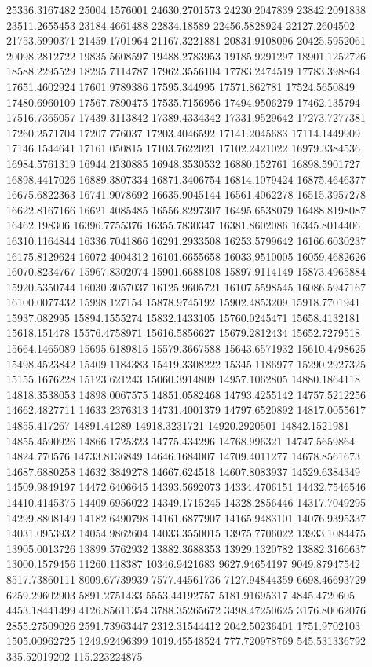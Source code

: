 \documentclass[draft=on]{scrbook}
\begin{document}
25336.3167482
25004.1576001
24630.2701573
24230.2047839
23842.2091838
23511.2655453
23184.4661488
22834.18589
22456.5828924
22127.2604502
21753.5990371
21459.1701964
21167.3221881
20831.9108096
20425.5952061
20098.2812722
19835.5608597
19488.2783953
19185.9291297
18901.1252726
18588.2295529
18295.7114787
17962.3556104
17783.2474519
17783.398864
17651.4602924
17601.9789386
17595.344995
17571.862781
17524.5650849
17480.6960109
17567.7890475
17535.7156956
17494.9506279
17462.135794
17516.7365057
17439.3113842
17389.4334342
17331.9529642
17273.7277381
17260.2571704
17207.776037
17203.4046592
17141.2045683
17114.1449909
17146.1544641
17161.050815
17103.7622021
17102.2421022
16979.3384536
16984.5761319
16944.2130885
16948.3530532
16880.152761
16898.5901727
16898.4417026
16889.3807334
16871.3406754
16814.1079424
16875.4646377
16675.6822363
16741.9078692
16635.9045144
16561.4062278
16515.3957278
16622.8167166
16621.4085485
16556.8297307
16495.6538079
16488.8198087
16462.198306
16396.7755376
16355.7830347
16381.8602086
16345.8014406
16310.1164844
16336.7041866
16291.2933508
16253.5799642
16166.6030237
16175.8129624
16072.4004312
16101.6655658
16033.9510005
16059.4682626
16070.8234767
15967.8302074
15901.6688108
15897.9114149
15873.4965884
15920.5350744
16030.3057037
16125.9605721
16107.5598545
16086.5947167
16100.0077432
15998.127154
15878.9745192
15902.4853209
15918.7701941
15937.082995
15894.1555274
15832.1433105
15760.0245471
15658.4132181
15618.151478
15576.4758971
15616.5856627
15679.2812434
15652.7279518
15664.1465089
15695.6189815
15579.3667588
15643.6571932
15610.4798625
15498.4523842
15409.1184383
15419.3308222
15345.1186977
15290.2927325
15155.1676228
15123.621243
15060.3914809
14957.1062805
14880.1864118
14818.3538053
14898.0067575
14851.0582468
14793.4255142
14757.5212256
14662.4827711
14633.2376313
14731.4001379
14797.6520892
14817.0055617
14855.417267
14891.41289
14918.3231721
14920.2920501
14842.1521981
14855.4590926
14866.1725323
14775.434296
14768.996321
14747.5659864
14824.770576
14733.8136849
14646.1684007
14709.4011277
14678.8561673
14687.6880258
14632.3849278
14667.624518
14607.8083937
14529.6384349
14509.9849197
14472.6406645
14393.5692073
14334.4706151
14432.7546546
14410.4145375
14409.6956022
14349.1715245
14328.2856446
14317.7049295
14299.8808149
14182.6490798
14161.6877907
14165.9483101
14076.9395337
14031.0953932
14054.9862604
14033.3550015
13975.7706022
13933.1084475
13905.0013726
13899.5762932
13882.3688353
13929.1320782
13882.3166637
13000.1579456
11260.118387
10346.9421683
9627.94654197
9049.87947542
8517.73860111
8009.67739939
7577.44561736
7127.94844359
6698.46693729
6259.29602903
5891.2751433
5553.44192757
5181.91695317
4845.4720605
4453.18441499
4126.85611354
3788.35265672
3498.47250625
3176.80062076
2855.27509026
2591.73963447
2312.31544412
2042.50236401
1751.9702103
1505.00962725
1249.92496399
1019.45548524
777.720978769
545.531336792
335.52019202
115.223224875
\end{document}
